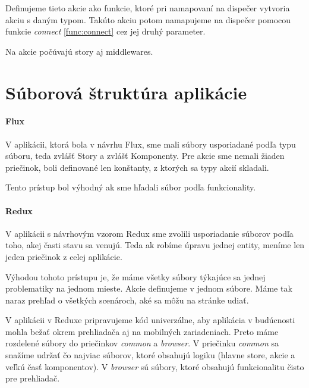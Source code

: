 Definujeme tieto akcie ako funkcie, ktoré pri namapovaní na dispečer vytvoria akciu s daným typom. Takúto akciu potom namapujeme na dispečer pomocou funkcie \emph{connect} \ref{func:connect} cez jej druhý parameter.

Na akcie počúvajú story aj middlewares.



\section{Súborová štruktúra aplikácie}
\NEW{}
\paragraph{Flux}
V aplikácii, ktorá bola v návrhu Flux, sme mali súbory usporiadané podľa typu súboru, teda zvlášť Story a zvlášť Komponenty. Pre akcie sme nemali žiaden priečinok, boli definované len konštanty, z ktorých sa typy akcií skladali.

Tento prístup bol výhodný ak sme hľadali súbor podľa funkcionality.

\paragraph{Redux}
V aplikácii s návrhovým vzorom Redux sme zvolili usporiadanie súborov podľa toho, akej časti stavu sa venujú. Teda ak robíme úpravu jednej entity, meníme len jeden priečinok z celej aplikácie.

Výhodou tohoto prístupu je, že máme všetky súbory týkajúce sa jednej problematiky na jednom mieste.
Akcie definujeme v jednom súbore. Máme tak naraz prehľad o všetkých scenároch, aké sa môžu na stránke udiať.

V aplikácii v Reduxe pripravujeme kód univerzálne, aby aplikácia v budúcnosti mohla bežať okrem prehliadača aj na mobilných zariadeniach. Preto máme rozdelené súbory do priečinkov \emph{common} a \emph{browser}. V priečinku \emph{common} sa snažíme udržať čo najviac súborov, ktoré obsahujú logiku (hlavne store, akcie a veľkú časť komponentov). V \emph{browser} sú súbory, ktoré obsahujú funkcionalitu čisto pre prehliadač.
